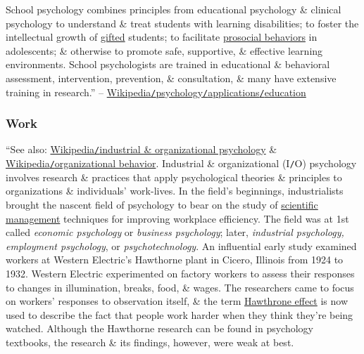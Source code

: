 \documentclass[oneside]{book}
\numberwithin{equation}{section}
\begin{document}
School psychology combines principles from educational psychology \& clinical psychology to understand \& treat students with learning disabilities; to foster the intellectual growth of \href{https://en.wikipedia.org/wiki/Intellectual_giftedness}{gifted} students; to facilitate \href{https://en.wikipedia.org/wiki/Prosocial_behavior}{prosocial behaviors} in adolescents; \& otherwise to promote safe, supportive, \& effective learning environments. School psychologists are trained in educational \& behavioral assessment, intervention, prevention, \& consultation, \& many have extensive training in research.'' -- \href{https://en.wikipedia.org/wiki/Psychology#Education}{Wikipedia\texttt{/}psychology\texttt{/}applications\texttt{/}education}

\subsubsection{Work}
``See also: \href{https://en.wikipedia.org/wiki/Industrial_and_organizational_psychology}{Wikipedia\texttt{/}industrial \& organizational psychology} \& \href{https://en.wikipedia.org/wiki/Organizational_behavior}{Wikipedia\texttt{/}organizational behavior}. Industrial \& organizational (I\texttt{/}O) psychology involves research \& practices that apply psychological theories \& principles to organizations \& individuals' work-lives. In the field's beginnings, industrialists brought the nascent field of psychology to bear on the study of \href{https://en.wikipedia.org/wiki/Scientific_management}{scientific management} techniques for improving workplace efficiency. The field was at 1st called \textit{economic psychology} or \textit{business psychology}; later, \textit{industrial psychology, employment psychology}, or \textit{psychotechnology}. An influential early study examined workers at Western Electric's Hawthorne plant in Cicero, Illinois from 1924 to 1932. Western Electric experimented on factory workers to assess their responses to changes in illumination, breaks, food, \& wages. The researchers came to focus on workers' responses to observation itself, \& the term \href{https://en.wikipedia.org/wiki/Hawthorne_effect}{Hawthrone effect} is now used to describe the fact that people work harder when they think they're being watched. Although the Hawthorne research can be found in psychology textbooks, the research \& its findings, however, were weak at best.
\end{document}
